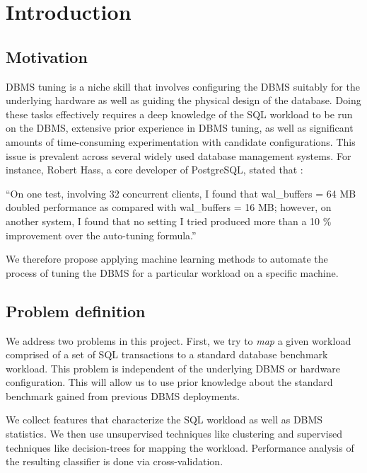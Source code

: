 \section{Introduction} \label{sec:intro}

\subsection{Motivation}

DBMS tuning is a niche skill that involves configuring the DBMS suitably for the
underlying hardware as well as guiding the physical design of the database.
Doing these tasks effectively requires a deep knowledge of the SQL workload to
be run on the DBMS, extensive prior experience in DBMS tuning, as well as
significant amounts of time-consuming experimentation with candidate
configurations. This issue is prevalent across several widely used database
management systems. For instance, Robert Hass, a core developer of PostgreSQL, 
stated that \citep{hass12} :

\begin{displayquote}
``On one test, involving 32 concurrent clients, I found that wal\_buffers = 64
MB doubled performance as compared with wal\_buffers = 16 MB; however, on
another system, I found that no setting I tried produced more than a 10 \%
improvement over the auto-tuning formula.'' 
\end{displayquote}

We therefore propose applying machine learning methods to automate the process
of tuning the DBMS for a particular workload on a specific machine.

\subsection{Problem definition}

We address two problems in this project.
First, we try to \textit{map} a given workload comprised of
a set of SQL transactions to a standard database benchmark workload. 
This problem is independent of the underlying DBMS or hardware configuration.
This will allow us to use prior knowledge about the standard 
benchmark gained from previous DBMS deployments. 

We collect features that characterize the SQL workload as well as 
DBMS statistics.
We then use unsupervised techniques like clustering
and supervised techniques like decision-trees 
for mapping the workload.
Performance analysis of the resulting classifier is done via
cross-validation.

